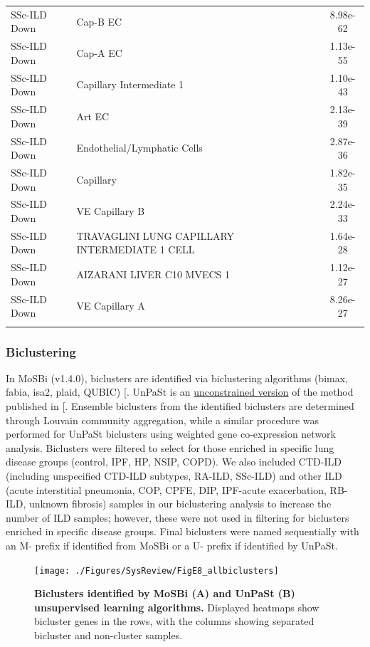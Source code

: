 \documentclass[
]{article}
\begin{document}
\begin{singlespace}
\begin{longtable}[t]{>{\raggedright\arraybackslash}p{0.8in}>{\raggedright\arraybackslash}p{4.5in}c}
\addlinespace
SSc-ILD Down & Cap-B EC & 8.98e-62\\
SSc-ILD Down & Cap-A EC & 1.13e-55\\
SSc-ILD Down & Capillary Intermediate 1 & 1.10e-43\\
SSc-ILD Down & Art EC & 2.13e-39\\
SSc-ILD Down & Endothelial/Lymphatic Cells & 2.87e-36\\
\addlinespace
SSc-ILD Down & Capillary & 1.82e-35\\
SSc-ILD Down & VE Capillary B & 2.24e-33\\
SSc-ILD Down & TRAVAGLINI LUNG CAPILLARY INTERMEDIATE 1 CELL & 1.64e-28\\
SSc-ILD Down & AIZARANI LIVER C10 MVECS 1 & 1.12e-27\\
SSc-ILD Down & VE Capillary A & 8.26e-27\\*
\end{longtable}
\endgroup{}

\end{singlespace}

\subsubsection{Biclustering}\label{biclustering-1}

In MoSBi (v1.4.0), biclusters are identified via biclustering algorithms (bimax, fabia, isa2, plaid, QUBIC) {[}\citeproc{ref-rose_mosbi_2022}{52}{]}. UnPaSt is an \href{https://github.com/ozolotareva/UnPaSt}{unconstrained version} of the method published in {[}\citeproc{ref-zolotareva_identification_2021}{53}{]}. Ensemble biclusters from the identified biclusters are determined through Louvain community aggregation, while a similar procedure was performed for UnPaSt biclusters using weighted gene co-expression network analysis. Biclusters were filtered to select for those enriched in specific lung disease groups (control, IPF, HP, NSIP, COPD). We also included CTD-ILD (including unspecified CTD-ILD subtypes, RA-ILD, SSc-ILD) and other ILD (acute interstitial pneumonia, COP, CPFE, DIP, IPF-acute exacerbation, RB-ILD, unknown fibrosis) samples in our biclustering analysis to increase the number of ILD samples; however, these were not used in filtering for biclusters enriched in specific disease groups. Final biclusters were named sequentially with an M- prefix if identified from MoSBi or a U- prefix if identified by UnPaSt.



\begin{figure}

{\centering \texttt{[image: ./Figures/SysReview/FigE8\_allbiclusters]} 

}

\caption[All biclusters]{\textbf{Biclusters identified by MoSBi (A) and UnPaSt (B) unsupervised learning algorithms.} Displayed heatmaps show bicluster genes in the rows, with the columns showing separated bicluster and non-cluster samples.}\label{fig:biclusterall}
\end{figure}
\end{document}
